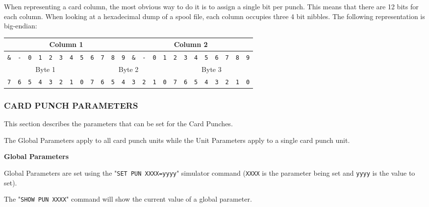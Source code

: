 When representing a card column, the most obvious way to do it is to assign a single bit per punch. This
means that there are 12 bits for each column. When looking at a hexadecimal dump of a spool file, each column
occupies three 4 bit nibbles. The following representation is big-endian:

\begin{adjustwidth}{5ex}{1ex}
	\begin{tabular}{|c|c|c|c|c|c|c|c|c|c|c|c|c|c|c|c|c|c|c|c|c|c|c|c|}
        \multicolumn{12}{|c|}{Column 1} & \multicolumn{12}{|c|}{Column 2} \\
        \hline
        \texttt{\&} & \texttt{-} & \texttt{0} & \texttt{1} & \texttt{2} & \texttt{3} & \texttt{4} & \texttt{5} & \texttt{6} & \texttt{7} & \texttt{8} & \texttt{9} & \texttt{\&} & \texttt{-} & \texttt{0} & \texttt{1} & \texttt{2} & \texttt{3} & \texttt{4} & \texttt{5} & \texttt{6} & \texttt{7} & \texttt{8} & \texttt{9} \\
        \hline
        \multicolumn{8}{|c|}{Byte 1} & \multicolumn{8}{|c|}{Byte 2} & \multicolumn{8}{|c|}{Byte 3} \\
        \texttt{7} & \texttt{6} & \texttt{5} & \texttt{4} & \texttt{3} & \texttt{2} & \texttt{1} & \texttt{0} & \texttt{7} & \texttt{6} & \texttt{5} & \texttt{4} & \texttt{3} & \texttt{2} & \texttt{1} & \texttt{0} & \texttt{7} & \texttt{6} & \texttt{5} & \texttt{4} & \texttt{3} & \texttt{2} & \texttt{1} & \texttt{0} \\
	\end{tabular}
\end{adjustwidth}

\newpage

\subsubsection[Card Punch Parameters]{CARD PUNCH PARAMETERS}

This section describes the parameters that can be set for the Card Punches.

The Global Parameters apply to all card punch units while the Unit Parameters apply to a single card punch unit.

\textbf{Global Parameters}

Global Parameters are set using the "\texttt{SET PUN XXXX=yyyy}" simulator command (\texttt{XXXX} is the parameter being set
and \texttt{yyyy} is the value to set).

The "\texttt{SHOW PUN XXXX}" command will show the current value of a global parameter.

